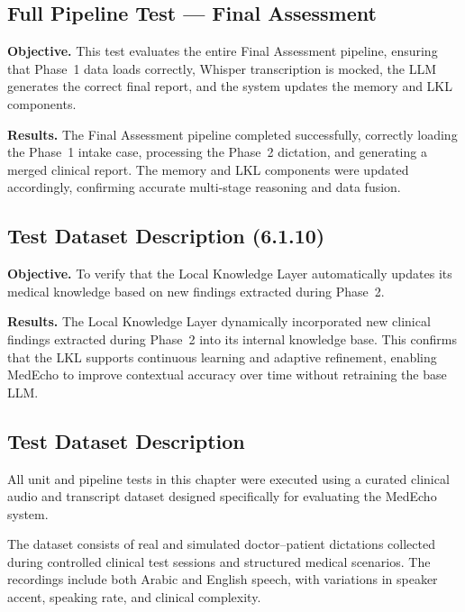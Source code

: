 \subsection{Full Pipeline Test — Final Assessment}
\label{sec:testing:full-final}

\textbf{Objective.}
This test evaluates the entire Final Assessment pipeline, ensuring that Phase~1 data loads
correctly, Whisper transcription is mocked, the LLM generates the correct final report, and
the system updates the memory and LKL components.

\textbf{Results.}
The Final Assessment pipeline completed successfully, correctly loading the Phase~1 intake
case, processing the Phase~2 dictation, and generating a merged clinical report. The memory
and LKL components were updated accordingly, confirming accurate multi-stage reasoning and
data fusion.



\subsection{Test Dataset Description (6.1.10)}
\label{sec:testing:dataset}


\textbf{Objective.}
To verify that the Local Knowledge Layer automatically updates its medical knowledge based
on new findings extracted during Phase~2.

\textbf{Results.}
The Local Knowledge Layer dynamically incorporated new clinical findings extracted during
Phase~2 into its internal knowledge base. This confirms that the LKL supports continuous
learning and adaptive refinement, enabling MedEcho to improve contextual accuracy over time
without retraining the base LLM.
\subsection{Test Dataset Description}
\label{sec:testing:dataset}

All unit and pipeline tests in this chapter were executed using a curated clinical
audio and transcript dataset designed specifically for evaluating the MedEcho system.

The dataset consists of real and simulated doctor–patient dictations collected during
controlled clinical test sessions and structured medical scenarios. The recordings
include both Arabic and English speech, with variations in speaker accent, speaking rate,
and clinical complexity.

